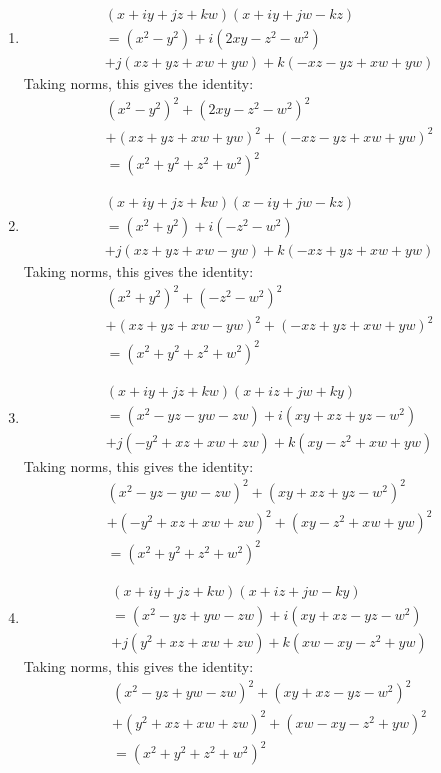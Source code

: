 \documentclass[12pt]{article}
\numberwithin{equation}{section}
\begin{document}
\begin{landscape}
{{\begin{enumerate}[{Identity} I:]
\item
    \begin{align*}
    &(x + iy + jz + kw)(x + iy + jw - kz) \\
    &= (x^2 - y^2 ) + i(2xy - z^2 - w^2) \\
        &+ j(xz + yz + xw + yw) + k(-xz - yz + xw + yw) 
    \end{align*}
Taking norms, this gives the identity:
    \begin{align*}
    &(x^2 - y^2 )^2 + (2xy - z^2 - w^2)^2 \\
        &+ (xz + yz + xw + yw)^2 + (-xz - yz + xw + yw)^2 \\ 
    &= (x^2 + y^2 + z^2 + w^2)^2
    \end{align*}
\item
    \begin{align*}
    &(x + iy + jz + kw)(x - iy + jw - kz) \\
    &= (x^2 + y^2 ) + i(- z^2 - w^2) \\
        &+ j(xz + yz + xw - yw) + k(-xz + yz + xw + yw) 
    \end{align*}
Taking norms, this gives the identity:
    \begin{align*}
    &(x^2 + y^2 )^2 + (- z^2 - w^2)^2 \\
        &+ (xz + yz + xw - yw)^2 + (-xz + yz + xw + yw)^2 \\
    &= (x^2 + y^2 + z^2 + w^2)^2
    \end{align*}
\item
    \begin{align*}
    &(x + iy + jz + kw)(x + iz + jw + ky) \\
    &= (x^2 - yz - yw - zw ) + i(xy + xz + yz - w^2) \\
        &+ j(-y^2 + xz + xw + zw) + k(xy - z^2 + xw + yw) 
    \end{align*}
Taking norms, this gives the identity:
    \begin{align*}
    &(x^2 - yz - yw - zw )^2 + (xy + xz + yz - w^2)^2 \\
        &+ (-y^2 + xz + xw + zw)^2 + (xy - z^2 + xw + yw)^2 \\
    &= (x^2 + y^2 + z^2 + w^2)^2
    \end{align*}
\item
    \begin{align*}
    &(x + iy + jz + kw)(x + iz + jw - ky) \\
    &= (x^2 - yz + yw - zw ) + i(xy + xz - yz - w^2) \\
        &+ j(y^2 + xz + xw + zw) + k(xw - xy - z^2  + yw) 
    \end{align*}
Taking norms, this gives the identity:
    \begin{align*}
    &(x^2 - yz + yw - zw )^2 + (xy + xz - yz - w^2)^2 \\
        &+ (y^2 + xz + xw + zw)^2 + (xw - xy - z^2  + yw)^2 \\
    &= (x^2 + y^2 + z^2 + w^2)^2
    \end{align*}
\end{enumerate}





}}
\end{landscape}
\end{document}
